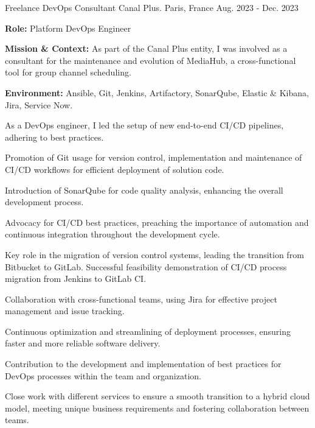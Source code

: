 \begin{cventries}
\cventry
{Freelance DevOps Consultant} %
{Canal Plus.} %
{Paris, France} %
{Aug. 2023 - Dec. 2023} %
{
  \begin{cvitems} %
    \item {\textbf{Role:} Platform DevOps Engineer}
    \item {\textbf{Mission \& Context:} As part of the Canal Plus entity, I was involved as a consultant for the maintenance and evolution of MediaHub, a cross-functional tool for group channel scheduling.}
    \item {\textbf{Environment:} Ansible, Git, Jenkins, Artifactory, SonarQube, Elastic \& Kibana, Jira, Service Now.}
    \item {As a DevOps engineer, I led the setup of new end-to-end CI/CD pipelines, adhering to best practices.}
    \item {Promotion of Git usage for version control, implementation and maintenance of CI/CD workflows for efficient deployment of solution code.}
    \item {Introduction of SonarQube for code quality analysis, enhancing the overall development process.}
    \item {Advocacy for CI/CD best practices, preaching the importance of automation and continuous integration throughout the development cycle.}
    \item {Key role in the migration of version control systems, leading the transition from Bitbucket to GitLab. Successful feasibility demonstration of CI/CD process migration from Jenkins to GitLab CI.}
    \item {Collaboration with cross-functional teams, using Jira for effective project management and issue tracking.}
    \item {Continuous optimization and streamlining of deployment processes, ensuring faster and more reliable software delivery.}
    \item {Contribution to the development and implementation of best practices for DevOps processes within the team and organization.}
    \item {Close work with different services to ensure a smooth transition to a hybrid cloud model, meeting unique business requirements and fostering collaboration between teams.}
  \end{cvitems}        
}


\end{cventries}
